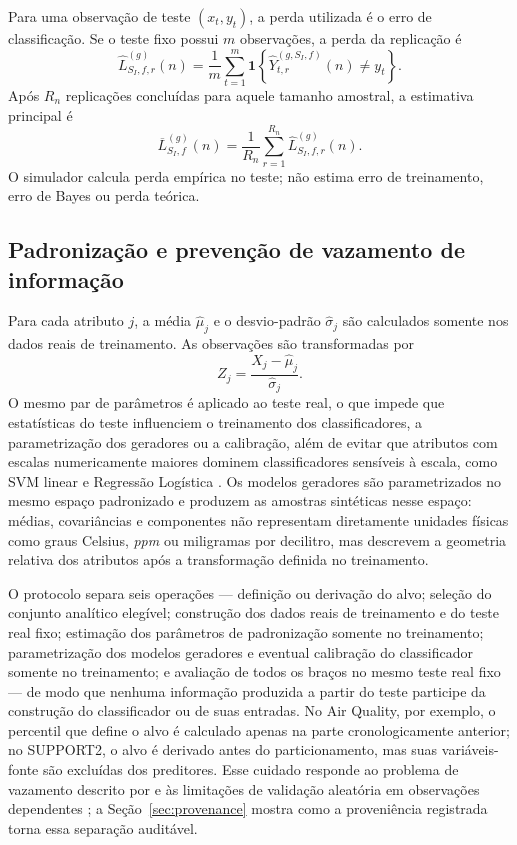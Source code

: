 Para uma observação de teste $(x_t,y_t)$, a perda utilizada é o erro de classificação. Se o teste fixo possui $m$ observações, a perda da replicação é
\begin{equation}
  \widehat{L}^{(g)}_{S_I,f,r}(n)
  =\frac{1}{m}\sum_{t=1}^{m}
  \mathbf{1}\!\left\{\widehat{Y}^{(g,S_I,f)}_{t,r}(n)\neq y_t\right\}.
  \label{eq:replication-loss}
\end{equation}
Após $R_n$ replicações concluídas para aquele tamanho amostral, a estimativa principal é
\begin{equation}
  \overline{L}^{(g)}_{S_I,f}(n)
  =\frac{1}{R_n}\sum_{r=1}^{R_n}\widehat{L}^{(g)}_{S_I,f,r}(n).
  \label{eq:mean-loss}
\end{equation}
O simulador calcula perda empírica no teste; não estima erro de treinamento, erro de Bayes ou perda teórica.

\subsection{Padronização e prevenção de vazamento de informação}

Para cada atributo $j$, a média $\widehat{\mu}_j$ e o desvio-padrão $\widehat{\sigma}_j$ são calculados somente nos dados reais de treinamento. As observações são transformadas por
\begin{equation}
  Z_j=\frac{X_j-\widehat{\mu}_j}{\widehat{\sigma}_j}.
  \label{eq:zscore}
\end{equation}
O mesmo par de parâmetros é aplicado ao teste real, o que impede que estatísticas do teste influenciem o treinamento dos classificadores, a parametrização dos geradores ou a calibração, além de evitar que atributos com escalas numericamente maiores dominem classificadores sensíveis à escala, como SVM linear e Regressão Logística \cite{pedregosa2011}. Os modelos geradores são parametrizados no mesmo espaço padronizado e produzem as amostras sintéticas nesse espaço: médias, covariâncias e componentes não representam diretamente unidades físicas como graus Celsius, \textit{ppm} ou miligramas por decilitro, mas descrevem a geometria relativa dos atributos após a transformação definida no treinamento.

O protocolo separa seis operações --- definição ou derivação do alvo; seleção do conjunto analítico elegível; construção dos dados reais de treinamento e do teste real fixo; estimação dos parâmetros de padronização somente no treinamento; parametrização dos modelos geradores e eventual calibração do classificador somente no treinamento; e avaliação de todos os braços no mesmo teste real fixo --- de modo que nenhuma informação produzida a partir do teste participe da construção do classificador ou de suas entradas. No Air Quality, por exemplo, o percentil que define o alvo é calculado apenas na parte cronologicamente anterior; no SUPPORT2, o alvo é derivado antes do particionamento, mas suas variáveis-fonte são excluídas dos preditores. Esse cuidado responde ao problema de vazamento descrito por \textcite{Kaufman2012} e às limitações de validação aleatória em observações dependentes \cite{Roberts2017,Bergmeir2012}; a Seção~\ref{sec:provenance} mostra como a proveniência registrada torna essa separação auditável.


